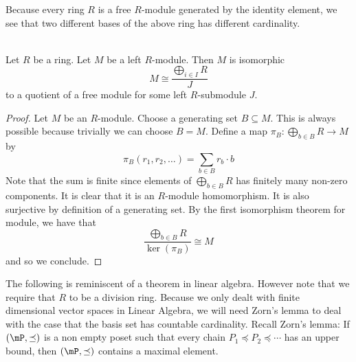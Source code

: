 \documentclass[a4paper]{article}
\begin{document}
Because every ring $R$ is a free $R$-module generated by the identity element, we see that two different bases of the above ring has different cardinality. 

\begin{lmm}{}{}\\
Let $R$ be a ring. Let $M$ be a left $R$-module. Then $M$ is isomorphic $$M\cong\frac{\bigoplus_{i\in I}R}{J}$$ to a quotient of a free module for some left $R$-submodule $J$. 
\begin{proof}
Let $M$ be an $R$-module. Choose a generating set $B\subseteq M$. This is always possible because trivially we can choose $B=M$. Define a map $\pi_B:\bigoplus_{b\in B}R\to M$ by $$\pi_B(r_1,r_2,\dots)=\sum_{b\in B}r_b\cdot b$$ Note that the sum is finite since elements of $\bigoplus_{b\in B}R$ has finitely many non-zero components. It is clear that it is an $R$-module homomorphism. It is also surjective by definition of a generating set. By the first isomorphism theorem for module, we have that $$\frac{\bigoplus_{b\in B}R}{\ker(\pi_B)}\cong M$$ and so we conclude. 
\end{proof}
\end{lmm}

The following is reminiscent of a theorem in linear algebra. However note that we require that $R$ to be a division ring. Because we only dealt with finite dimensional vector spaces in Linear Algebra, we will need Zorn's lemma to deal with the case that the basis set has countable cardinality. Recall Zorn's lemma: If $(\mP,\preceq)$ is a non empty poset such that every chain $P_1\preceq P_2\preceq\cdots$ has an upper bound, then $(\mP,\preceq)$ contains a maximal element. 
\end{document}
